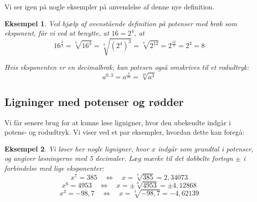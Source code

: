 \documentclass[12pt,oneside,a4paper]{article}
\theoremstyle{plain}
\newtheorem*{eks}{Eksempel}
\begin{document}
Vi ser igen på nogle eksempler på anvendelse af denne nye definition.
\begin{eks}
    Ved hjælp af ovenstående definition på potenser med brøk som eksponent,
    får vi ved at benytte, at $16=2^4$, at
    $$
    16^\frac34 = \sqrt[4]{16^3} = \sqrt[4]{\left(2^4\right)^3} = 
    \sqrt[4]{2^{12}} = 2^\frac{12}{4} = 2^3 = 8
    $$

    Hvis eksponenten er en decimalbrøk, kan potesen også omskrives til et rodudtryk:
    $$
    a^{0,3} = a^\frac{3}{10} = \sqrt[10]{a^3}
    $$
\end{eks}

\subsection*{Ligninger med potenser og rødder}

Vi får senere brug for at kunne løse lignigner, hvor den ubekendte indgår i
potens- og rodudtryk. Vi viser ved et par eksempler, hvordan dette kan foregå:

\begin{eks}
    Vi løser her nogle lignigner, hvor $x$ indgår som grundtal i potenser, og
    angiver løsningerne med 5 decimaler. Læg mærke til det dobbelte fortegn 
    $\pm$ i forbindelse med {\em lige} eksponenter:
    $$
    x^7 = 385 \quad\Leftrightarrow\quad x = \sqrt[7]{385} = 2,34073
    $$
    $$
    x^6 = 4953 \quad\Leftrightarrow\quad x = \pm \sqrt[6]{4953} = \pm 4,12868
    $$
    $$
    x^3 = -98,7 \quad\Leftrightarrow\quad x = \sqrt[3]{-98,7} = -4,62139
    $$
\end{eks}
\end{document}

